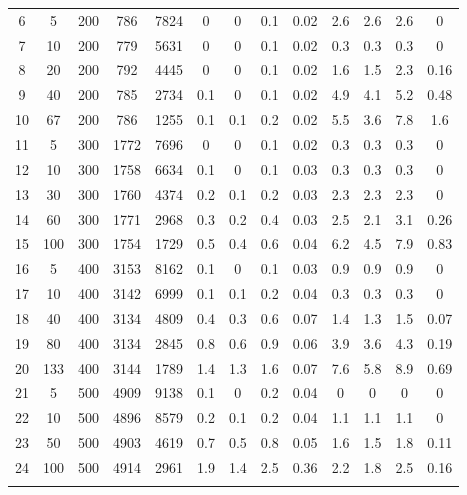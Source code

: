 \documentclass[11pt]{article}
\newcommand{\np}{\newpage}
\begin{document}
\begin{appendices}
\begin{landscape}
\begin{longtable}[c]{ccccc|cccc|cccc}
				6 & 5 & 200 & 786 & 7824 & 0 & 0 & 0.1 & 0.02 & 2.6 & 2.6 & 2.6 & 0 \\
				7 & 10 & 200 & 779 & 5631 & 0 & 0 & 0.1 & 0.02 & 0.3 & 0.3 & 0.3 & 0 \\
				8 & 20 & 200 & 792 & 4445 & 0 & 0 & 0.1 & 0.02 & 1.6 & 1.5 & 2.3 & 0.16 \\
				9 & 40 & 200 & 785 & 2734 & 0.1 & 0 & 0.1 & 0.02 & 4.9 & 4.1 & 5.2 & 0.48 \\
				10 & 67 & 200 & 786 & 1255 & 0.1 & 0.1 & 0.2 & 0.02 & 5.5 & 3.6 & 7.8 & 1.6 \\
				\rowcolor[HTML]{EFEFEF} 
				11 & 5 & 300 & 1772 & 7696 & 0 & 0 & 0.1 & 0.02 & 0.3 & 0.3 & 0.3 & 0 \\
				\rowcolor[HTML]{EFEFEF} 
				12 & 10 & 300 & 1758 & 6634 & 0.1 & 0 & 0.1 & 0.03 & 0.3 & 0.3 & 0.3 & 0 \\
				\rowcolor[HTML]{EFEFEF} 
				13 & 30 & 300 & 1760 & 4374 & 0.2 & 0.1 & 0.2 & 0.03 & 2.3 & 2.3 & 2.3 & 0 \\
				\rowcolor[HTML]{EFEFEF} 
				14 & 60 & 300 & 1771 & 2968 & 0.3 & 0.2 & 0.4 & 0.03 & 2.5 & 2.1 & 3.1 & 0.26 \\
				\rowcolor[HTML]{EFEFEF} 
				15 & 100 & 300 & 1754 & 1729 & 0.5 & 0.4 & 0.6 & 0.04 & 6.2 & 4.5 & 7.9 & 0.83 \\
				16 & 5 & 400 & 3153 & 8162 & 0.1 & 0 & 0.1 & 0.03 & 0.9 & 0.9 & 0.9 & 0 \\
				17 & 10 & 400 & 3142 & 6999 & 0.1 & 0.1 & 0.2 & 0.04 & 0.3 & 0.3 & 0.3 & 0 \\
				18 & 40 & 400 & 3134 & 4809 & 0.4 & 0.3 & 0.6 & 0.07 & 1.4 & 1.3 & 1.5 & 0.07 \\
				19 & 80 & 400 & 3134 & 2845 & 0.8 & 0.6 & 0.9 & 0.06 & 3.9 & 3.6 & 4.3 & 0.19 \\
				20 & 133 & 400 & 3144 & 1789 & 1.4 & 1.3 & 1.6 & 0.07 & 7.6 & 5.8 & 8.9 & 0.69 \\ \np
				\rowcolor[HTML]{EFEFEF} 
				21 & 5 & 500 & 4909 & 9138 & 0.1 & 0 & 0.2 & 0.04 & 0 & 0 & 0 & 0 \\
				\rowcolor[HTML]{EFEFEF} 
				22 & 10 & 500 & 4896 & 8579 & 0.2 & 0.1 & 0.2 & 0.04 & 1.1 & 1.1 & 1.1 & 0 \\
				\rowcolor[HTML]{EFEFEF} 
				23 & 50 & 500 & 4903 & 4619 & 0.7 & 0.5 & 0.8 & 0.05 & 1.6 & 1.5 & 1.8 & 0.11 \\
				\rowcolor[HTML]{EFEFEF} 
				24 & 100 & 500 & 4914 & 2961 & 1.9 & 1.4 & 2.5 & 0.36 & 2.2 & 1.8 & 2.5 & 0.16 \\
				\rowcolor[HTML]{EFEFEF} 

\end{longtable}
\end{landscape}
\end{appendices}
\end{document}
